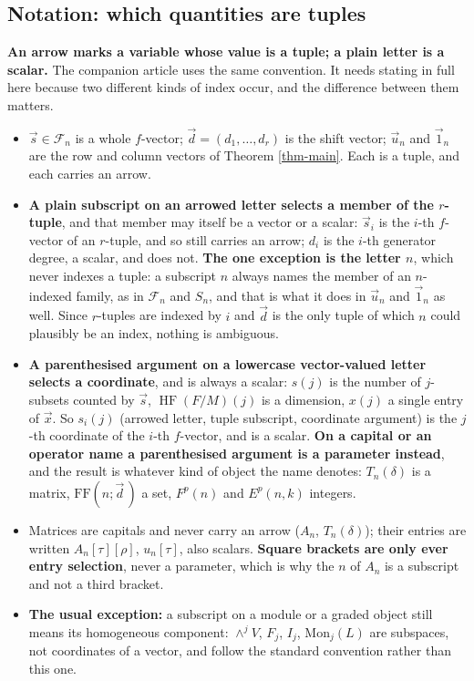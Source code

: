 \documentclass[11pt, a4paper, abstract=yes]{scrartcl}
\theoremstyle{definition}
\theoremstyle{remark}
\theoremstyle{plain}
\newcommand{\HF}{\operatorname{HF}}
\begin{document}
\subsection{Notation: which quantities are tuples}
\label{sec:org27e5955}

\textbf{An arrow marks a variable whose value is a tuple; a plain letter is a scalar.} The companion
article uses the same convention. It needs stating in full here because two different kinds of index
occur, and the difference between them matters.

\begin{itemize}
\item \(\vec s\in\mathcal F_n\) is a whole \(f\)-vector; \(\vec d=(d_1,\dots,d_r)\) is the shift vector;
\(\vec u_n\) and \(\vec 1_n\) are the row and column vectors of Theorem \ref{thm-main}. Each is a tuple, and
each carries an arrow.
\item \textbf{A plain subscript on an arrowed letter selects a member of the \(r\)-tuple}, and that member may
itself be a vector or a scalar: \(\vec s_i\) is the \(i\)-th \(f\)-vector of an \(r\)-tuple, and so
still carries an arrow; \(d_i\) is the \(i\)-th generator degree, a scalar, and does not.
\textbf{The one exception is the letter \(n\)}, which never indexes a tuple: a subscript \(n\) always
names the member of an \(n\)-indexed family, as in \(\mathcal F_n\) and \(S_n\), and that is what
it does in \(\vec u_n\) and \(\vec 1_n\) as well. Since \(r\)-tuples are indexed by \(i\) and
\(\vec d\) is the only tuple of which \(n\) could plausibly be an index, nothing is ambiguous.
\item \textbf{A parenthesised argument on a lowercase vector-valued letter selects a coordinate}, and is
always a scalar: \(s(j)\) is the number of \(j\)-subsets counted by \(\vec s\),
\(\HF(F/M)(j)\) is a dimension, \(x(j)\) a single entry of \(\vec x\). So \(s_i(j)\) (arrowed
letter, tuple subscript, coordinate argument) is the \(j\)-th coordinate of the \(i\)-th
\(f\)-vector, and is a scalar. \textbf{On a capital or an operator name a parenthesised argument is a
parameter instead}, and the result is whatever kind of object the name denotes: \(T_n(\delta)\)
is a matrix, \(\mathrm{FF}(n;\vec d\,)\) a set, \(F^p(n)\) and \(E^p(n,k)\) integers.
\item Matrices are capitals and never carry an arrow (\(A_n\), \(T_n(\delta)\)); their entries are written
\(A_n[\tau][\rho]\), \(u_n[\tau]\), also scalars. \textbf{Square brackets are only ever entry selection},
never a parameter, which is why the \(n\) of \(A_n\) is a subscript and not a third bracket.
\item \textbf{The usual exception:} a subscript on a module or a graded object still means its
homogeneous component: \(\wedge^jV\), \(F_j\), \(I_j\), \(\mathrm{Mon}_j(L)\) are subspaces, not
coordinates of a vector, and follow the standard convention rather than this one.
\end{itemize}
\end{document}
